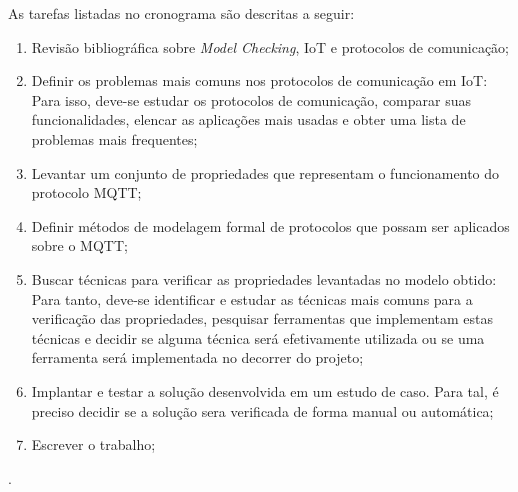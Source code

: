 As tarefas listadas no cronograma são descritas a seguir:
\begin{enumerate}
	\item \label{cron:revisao} Revisão bibliográfica sobre \textit{Model Checking}, IoT e protocolos de comunicação;
	\item \label{cron:ptcl} Definir os problemas mais comuns nos protocolos de comunicação em IoT: Para isso, deve-se estudar os protocolos de comunicação, comparar suas funcionalidades, elencar as aplicações mais usadas e obter uma lista de problemas mais frequentes;
	\item \label{cron:propr}Levantar um conjunto de propriedades que representam o funcionamento do protocolo MQTT;
	\item \label{cron:model} Definir métodos de modelagem formal de protocolos que possam ser aplicados sobre o MQTT;
	\item \label{cron:buscar} Buscar técnicas para verificar as propriedades levantadas no modelo obtido: Para tanto, deve-se identificar e estudar as técnicas mais comuns para a verificação das propriedades, pesquisar ferramentas que implementam estas técnicas e decidir se alguma técnica será efetivamente utilizada ou se uma ferramenta será implementada no decorrer do projeto;
	\item \label{cron:teste} Implantar e testar a solução desenvolvida em um estudo de caso. Para tal, é preciso decidir se a solução sera verificada de forma manual ou automática;
	\item \label{cron:tcc} Escrever o trabalho;
\end{enumerate}







.



